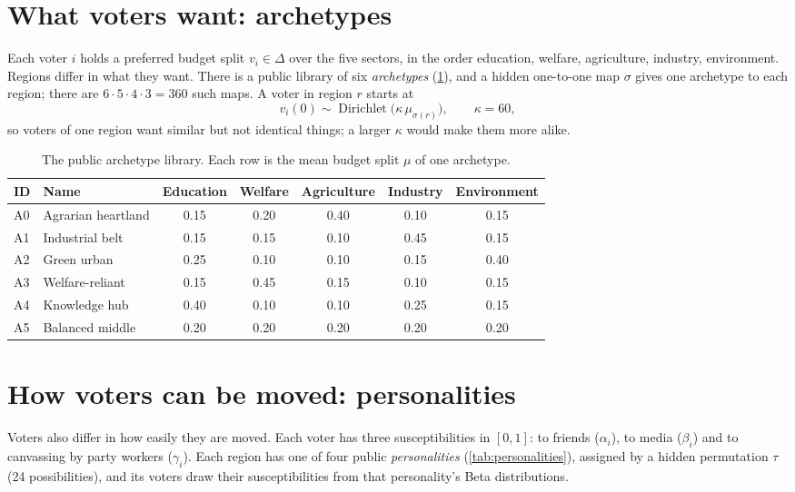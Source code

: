 \documentclass[11pt,a4paper,oneside]{report}
\newcommand{\simplex}{\Delta}
\begin{document}
\section{What voters want: archetypes}

Each voter $i$ holds a preferred budget split $v_i \in \simplex$ over the five sectors, in the order
education, welfare, agriculture, industry, environment. Regions differ in what they want. There is a
public library of six \emph{archetypes} (\cref{tab:archetypes}), and a hidden one-to-one map $\sigma$
gives one archetype to each region; there are $6\cdot5\cdot4\cdot3 = 360$ such maps. A voter in region $r$
starts at
\begin{equation}
  v_i(0) \sim \operatorname{Dirichlet}\bigl(\kappa\,\mu_{\sigma(r)}\bigr), \qquad \kappa = 60,
\end{equation}
so voters of one region want similar but not identical things; a larger $\kappa$ would make them more
alike.

\begin{table}[t]
\centering
\caption{The public archetype library. Each row is the mean budget split $\mu$ of one archetype.}
\label{tab:archetypes}
\small
\begin{tabular}{@{}llccccc@{}}
\toprule
ID & Name & Education & Welfare & Agriculture & Industry & Environment \\
\midrule
A0 & Agrarian heartland & 0.15 & 0.20 & 0.40 & 0.10 & 0.15 \\
A1 & Industrial belt    & 0.15 & 0.15 & 0.10 & 0.45 & 0.15 \\
A2 & Green urban        & 0.25 & 0.10 & 0.10 & 0.15 & 0.40 \\
A3 & Welfare-reliant    & 0.15 & 0.45 & 0.15 & 0.10 & 0.15 \\
A4 & Knowledge hub      & 0.40 & 0.10 & 0.10 & 0.25 & 0.15 \\
A5 & Balanced middle    & 0.20 & 0.20 & 0.20 & 0.20 & 0.20 \\
\bottomrule
\end{tabular}
\end{table}

\section{How voters can be moved: personalities}

Voters also differ in how easily they are moved. Each voter has three susceptibilities in $[0,1]$: to
friends ($\alpha_i$), to media ($\beta_i$) and to canvassing by party workers ($\gamma_i$). Each region has
one of four public \emph{personalities} (\cref{tab:personalities}), assigned by a hidden permutation $\tau$
(24 possibilities), and its voters draw their susceptibilities from that personality's Beta distributions.
\end{document}
